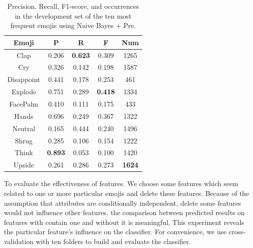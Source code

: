\documentclass[11pt]{article}
\begin{document}
\begin{table}
	\centering
	\begin{tabular}{c|ccc|c}
		\hline
		\textbf{Emoji} & \textbf{P} & \textbf{R} & \textbf{F} & \textbf{Num} \\
		\hline
		Clap &				0.206  &    \textbf{0.623}   & 0.309 & 1265 \\
		Cry & 				0.326    &  0.142   & 0.198 & 1587 \\
		Disappoint &  0.441    &  0.178   & 0.253 & 461 \\
		Explode & 		0.751    &  0.289   & \textbf{0.418} & 1334 \\
		FacePalm & 		0.410   &   0.111   & 0.175 & 433 \\
		Hands &			 0.696   &   0.249  &  0.367 & 1322 \\
		Neutral & 		0.165     & 0.444    &0.240 & 1496 \\
		Shrug & 		0.285    &  0.106   & 0.154 & 1222 \\
		Think  & 		\textbf{0.893}    &  0.053   & 0.100 & 1420 \\
		Upside & 		0.261    &  0.286  &  0.273& \textbf{1624} \\
		\hline
	\end{tabular}
	\caption{Precision, Recall, F1-score, and occurrences in the development set of the ten most frequent emojis using Naive Bayes + Pre.}
	\label{tab:1}
\end{table}

To evaluate the effectiveness of features. We choose some features which seem related to one or more particular emojis and delete these features. Because of the assumption that attributes are conditionally independent, delete some features would not influence other features. the comparison between predicted results on features with contain one and without it is meaningful, This experiment reveals the particular feature's influence on the classifier. For convenience, we use cross-validation with ten folders to build and evaluate the classifier. 
\end{document}
